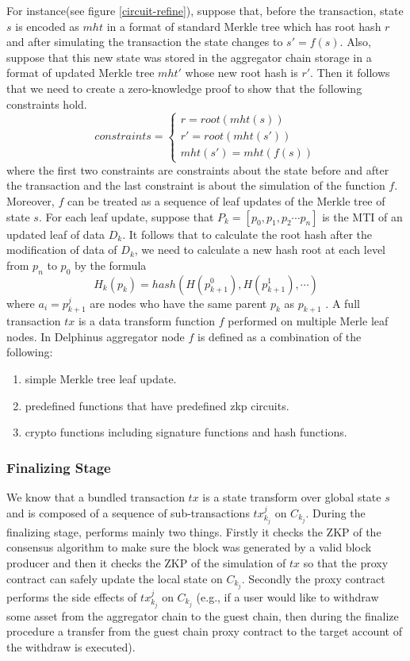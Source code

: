 \documentclass[pageno]{jpaper}
\begin{document}
For instance(see figure \ref{circuit-refine}), suppose that, before the transaction, state $s$ is encoded as $mht$ in a format of standard Merkle tree which has root hash $r$ and after simulating the transaction the state changes to $s' = f(s)$. Also, suppose that this new state was stored in the aggregator chain storage in a format of updated Merkle tree $mht'$ whose new root hash is $r'$.
Then it follows that we need to create a zero-knowledge proof to show that the following constraints hold.
\[ constraints = \begin{cases}
    r = root(mht(s)) \\
    r' = root(mht(s'))\\
    mht(s') = mht(f(s))
\end{cases} \]
where the first two constraints are constraints about the state before and after the transaction and the last constraint is about the simulation of the function $f$.\\
\newline
Moreover, $f$ can be treated as a sequence of leaf updates of the Merkle tree of state $s$. For each leaf update, suppose that $P_k = [p_0, p_1, p_2 \cdots p_n]$ is the MTI of an updated leaf of data $D_k$. It follows that to calculate the root hash after the modification of data of $D_k$, we need to calculate a new hash root at each level from $p_n$ to $p_0$ by the formula
$$
    H_k(p_k) = hash(H(p_{k+1}^0), H(p_{k+1}^1),\cdots) 
$$
where $a_i = p_{k+1}^{j}$ are nodes who have the same parent $p_k$ as $p_{k+1}$ \cite{liskov2005updatable}. A full transaction $tx$ is a data transform function $f$ performed on multiple Merle leaf nodes. In Delphinus aggregator node $f$ is defined as a combination of the following:

\begin{enumerate}[leftmargin=*]
\item simple Merkle tree leaf update.
\item predefined functions that have predefined zkp circuits.
\item crypto functions including signature functions and hash functions.
\end{enumerate}

\subsubsection{Finalizing Stage}
We know that a bundled transaction $tx$ is a state transform over global state $s$ and is composed of a sequence of sub-transactions $tx^j_{k_j}$ on $C_{k_j}$. During the finalizing stage, \dprotocol performs mainly two things. Firstly it checks the ZKP of the consensus algorithm to make sure the block was generated by a valid block producer and then it checks the ZKP of the simulation of $tx$ so that the proxy contract can safely update the local state on $C_{k_j}$. Secondly the proxy contract performs the side effects of $tx^j_{k_j}$ on $C_{k_j}$ (e.g., if a user would like to withdraw some asset from the aggregator chain to the guest chain, then during the finalize procedure a transfer from the guest chain proxy contract to the target account of the withdraw is executed).
\end{document}
